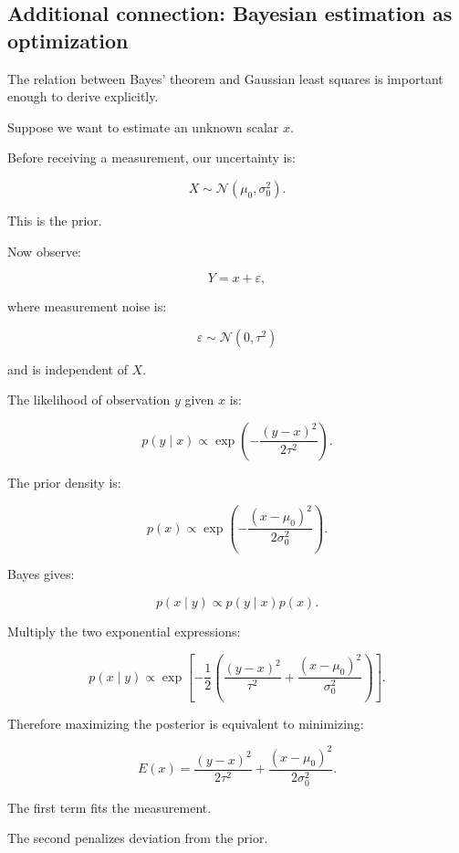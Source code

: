 \hypertarget{02-foundations-ii-ch031-use-probability-to-evaluate-graphics-and-research-claims}{}

\subsection{Additional connection: Bayesian estimation as optimization}\label{02-foundations-ii-ch031-additional-connection-bayesian-estimation-as-optimization}

\hypertarget{02-foundations-ii-ch031-additional-connection-bayesian-estimation-as-optimization}{}

The relation between Bayes' theorem and Gaussian least squares is important enough to derive explicitly.

Suppose we want to estimate an unknown scalar \(x\).

Before receiving a measurement, our uncertainty is:

\[
 X\sim\mathcal N(\mu_0,\sigma_0^2).
\]

This is the prior.

Now observe:

\[
 Y=x+\varepsilon,
\]

where measurement noise is:

\[
 \varepsilon\sim\mathcal N(0,\tau^2)
\]

and is independent of \(X\).

The likelihood of observation \(y\) given \(x\) is:

\[
 p(y\mid x) \propto \exp\left( -\frac{(y-x)^2}{2\tau^2} \right).
\]

The prior density is:

\[
 p(x)\propto \exp\left( -\frac{(x-\mu_0)^2}{2\sigma_0^2} \right).
\]

Bayes gives:

\[
 p(x\mid y)\propto p(y\mid x)p(x).
\]

Multiply the two exponential expressions:

\[
 p(x\mid y) \propto \exp\left[ -\frac12 \left( \frac{(y-x)^2}{\tau^2} + \frac{(x-\mu_0)^2}{\sigma_0^2} \right) \right].
\]

Therefore maximizing the posterior is equivalent to minimizing:

\[
 \boxed{ E(x)= \frac{(y-x)^2}{2\tau^2} + \frac{(x-\mu_0)^2}{2\sigma_0^2} }.
\]

The first term fits the measurement.

The second penalizes deviation from the prior.

